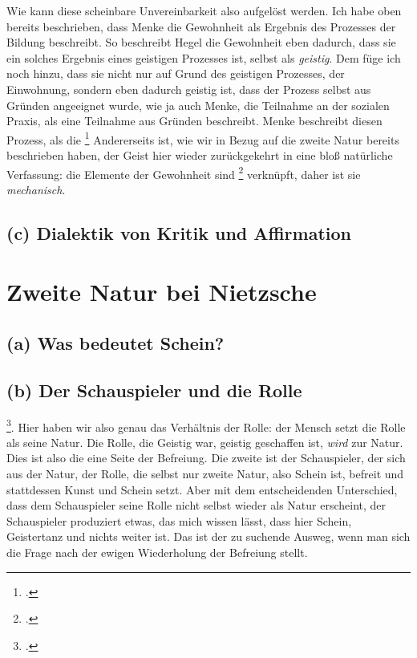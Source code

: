 \documentclass[12pt, a4paper, openany]{report}
\begin{document}
Wie kann diese scheinbare Unvereinbarkeit also aufgelöst werden. 
Ich habe oben bereits beschrieben, dass Menke die Gewohnheit als Ergebnis des Prozesses der Bildung beschreibt.
So beschreibt Hegel die Gewohnheit eben dadurch, dass sie ein solches Ergebnis eines geistigen Prozesses ist, selbst als \emph{geistig}. 
Dem füge ich noch hinzu, dass sie nicht nur auf Grund des geistigen Prozesses, der Einwohnung, sondern eben dadurch geistig ist, dass der Prozess selbst aus Gründen angeeignet wurde, wie ja auch Menke, die Teilnahme an der sozialen Praxis, als eine Teilnahme aus Gründen beschreibt.
Menke beschreibt diesen Prozess, als die \footcite[][129]{menke_autonomie_2018}
Andererseits ist, wie wir in Bezug auf die zweite Natur bereits beschrieben haben, der Geist hier wieder zurückgekehrt in eine bloß natürliche Verfassung: 
die Elemente der Gewohnheit sind \footcite[][129]{menke_autonomie_2018} verknüpft, daher ist sie \emph{mechanisch}.





\subsection{(c) Dialektik von Kritik und Affirmation}

\section{Zweite Natur bei Nietzsche}\label{abschnitt_2}

\subsection{(a) Was bedeutet Schein?}

\subsection{(b) Der Schauspieler und die Rolle}
\footcite[][393]{khurana_freiheit_2017}. 
Hier haben wir also genau das Verhältnis der Rolle: der Mensch setzt die Rolle als seine Natur. 
Die Rolle, die Geistig war, geistig geschaffen ist, \emph{wird} zur Natur. 
Dies ist also die eine Seite der Befreiung. 
Die zweite ist der Schauspieler, der sich aus der Natur, der Rolle, die selbst nur zweite Natur, also Schein ist, befreit und stattdessen Kunst und Schein setzt. 
Aber mit dem entscheidenden Unterschied, dass dem Schauspieler seine Rolle nicht selbst wieder als Natur erscheint, der Schauspieler produziert etwas, das mich wissen lässt, dass hier Schein, Geistertanz und nichts weiter ist. 
Das ist der zu suchende Ausweg, wenn man sich die Frage nach der ewigen Wiederholung der Befreiung stellt.
\end{document}
